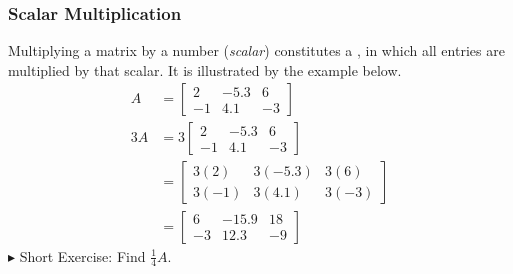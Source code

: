 \subsubsection{Scalar Multiplication} Multiplying a matrix by a number (\textit{scalar}) constitutes a , in which all entries are multiplied by that scalar. It is illustrated by the example below.
\begin{align*}
A &= 
\begin{bmatrix}
2 & -5.3 & 6 \\
-1 & 4.1 & -3
\end{bmatrix} \\
3A &= 3
\begin{bmatrix}
2 & -5.3 & 6 \\
-1 & 4.1 & -3
\end{bmatrix} \\
&=
\begin{bmatrix}
3(2) & 3(-5.3) & 3(6) \\
3(-1) & 3(4.1) & 3(-3)
\end{bmatrix} \\
&=
\begin{bmatrix}
6 & -15.9 & 18 \\
-3 & 12.3 & -9
\end{bmatrix}
\end{align*}
$\blacktriangleright$ Short Exercise: Find $\frac{1}{4}A$.\footnotemark

